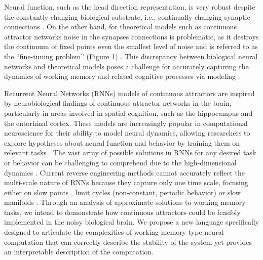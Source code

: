\documentclass[12pt,letterpaper, onecolumn]{article}
\theoremstyle{definition}
\theoremstyle{remark}
\begin{document}
Neural function, such as the head direction representation, is very robust despite the constantly changing biological substrate, i.e., continually changing synaptic connections \citep{gallego2020, kim2019generation, flesch2023continual}.
On the other hand, for theoretical models such as continuous attractor networks noise in the synapses connections is problematic, as it destroys the continuum of fixed points even the smallest level of noise and is referred to as the ``fine-tuning problem'' (Figure 1) \citep{seung1996, renart2003}.
This discrepancy between biological neural networks and theoretical models poses a challenge for accurately capturing the dynamics of working memory and related cognitive processes via modeling \citep{calaim2022geometry, renart2003, seeholzer2019, machens2008}.

Recurrent Neural Networks (RNNs) models of continuous attractors are inspired by neurobiological findings of continuous attractor networks in the brain, particularly in areas involved in spatial cognition, such as the hippocampus and the entorhinal cortex.
These models are increasingly popular in computational neuroscience for their ability to model neural dynamics, allowing researchers to explore hypotheses about neural function and behavior by training them on relevant tasks \citep{darshan2022, barak2017recurrent, durstewitz2023reconstructing, yang2019task, yang2019multiple, yang2020artificial, jarne2023b, song2016}. %
The vast array of possible solutions in RNNs for any desired task or behavior can be challenging to comprehend due to the high-dimensional dynamics \citep{lipton2018}.
Current reverse engineering methods cannot accurately reflect the multi-scale nature of RNNs because they capture only one time scale, focusing either on slow points \citep{sussillo2013blackbox}, limit cycles (non-constant, periodic behavior) \citep{pals2024, Zhao2016d} or slow manifolds \citep{ghazizadeh2021slow}.
%
Through an analysis of approximate solutions to working memory tasks, we intend to demonstrate how continuous attractors could be feasibly implemented in the noisy biological brain.
We propose a new language specifically designed to articulate the complexities of working-memory type neural computation that can correctly describe the stability of the system yet provides an interpretable description of the computation. 
\end{document}
